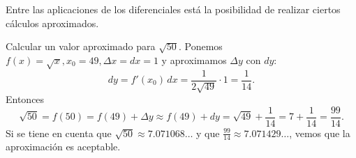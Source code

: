Entre las aplicaciones de los diferenciales está la posibilidad de realizar ciertos cálculos
aproximados.

\begin{exemplo}[Solución]{%
Calcular un valor aproximado para $\sqrt{50}$.
}%
Ponemos $f(x)=\sqrt{x}, x_0=49,\Delta x= dx=1$ y aproximamos $\Delta y$ con $dy$:
\begin{equation*}
	 dy=f'(x_0)\,dx=\frac{1}{2\sqrt{49}}\cdot 1=\frac{1}{14}.
\end{equation*}
Entonces
\begin{equation*}
	\sqrt{50}=f(50)=f(49)+\Delta y\approx f(49)+dy=\sqrt{49}+\frac{1}{14}=7+\frac{1}{14}=\frac{99}{14}.
\end{equation*}
Si se tiene en cuenta que $\sqrt{50}\approx 7.071068 \ldots$ y que $\frac{99}{14}\approx 7.071429
\dots$, vemos que la aproximación es aceptable.
\end{exemplo}

